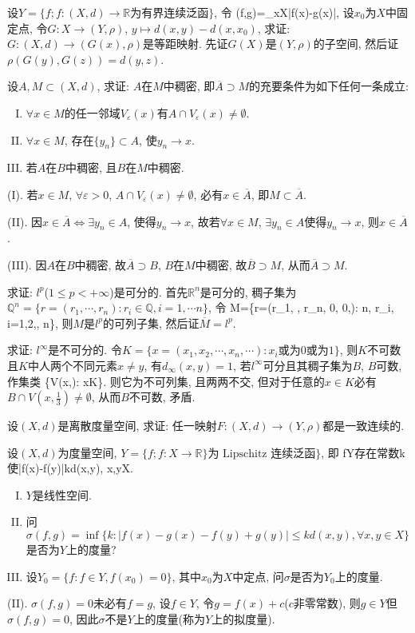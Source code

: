 \bq{}{}
设$Y=\{f; f:(X,d)\to\mathbb{R}\textrm{为有界连续泛函}\}$, 令
\bee
\rho(f,g)=\sup_{x\in X}|f(x)-g(x)|,
\eee
设$x_0$为$X$中固定点, 令$G: X\to(Y,\rho)$, $y\mapsto d(x,y)-d(x, x_0)$, 求证:
$G:(X,d)\to(G(x), \rho)$是等距映射.
\eq
\ba
先证$G(X)$是$(Y,\rho)$的子空间, 然后证$\rho(G(y), G(z))=d(y,z)$.
\ea

\bq{}{}
设$A, M\subset(X,d)$, 求证: $A$在$M$中稠密, 即$\overline{A}\supset M$的充要条件为如下任何一条成立:
\begin{enumerate}[(I)]
 \item $\forall x\in M$的任一邻域$V_{\varepsilon}(x)$有$A\cap V_{\varepsilon}(x)\ne\emptyset$.
 \item $\forall x\in M$, 存在$\{y_n\}\subset A$, 使$y_n\to x$.
 \item 若$A$在$B$中稠密, 且$B$在$M$中稠密.
\end{enumerate}
\eq
\ba
(I).  若$x\in M$, $\forall \varepsilon>0$, $A\cap V_{\varepsilon}(x)\ne \emptyset$, 必有$x\in\overline{A}$, 即$M\subset\overline{A}$.

(II). 因$x\in\overline{A}\Longleftrightarrow\exists y_n\in A$, 使得$y_n\to x$, 故若$\forall x\in M$, $\exists y_n\in A$使得$y_n\to x$, 则$x\in\overline{A}$.

(III). 因$A$在$B$中稠密, 故$\overline{A}\supset B$, $B$在$M$中稠密, 故$\overline{B}\supset M$, 从而$\overline{A}\supset M$.
\ea

\bq{}{}
求证: $l^p$($1\le p<+\infty$)是可分的.
\eq
\ba
首先$\mathbb{R}^n$是可分的, 稠子集为$\mathbb{Q}^n=\{r=(r_1,\cdots,r_n):r_i\in\mathbb{Q},i=1,\cdots n\}$, 
令
\bee
M=\{r=(r_1, \cdots, r_n, 0, 0,\cdots): n\in {}, r_i\in {}, i=1,2,\cdots, n\}, 
\eee
则$M$是$l^p$的可列子集,
然后证$\overline{M}=l^p$.
\ea

\bq{}{}
求证: $l^{\infty}$是不可分的.
\eq
\ba
令$K=\{x=(x_1, x_2,\cdots, x_n, \cdots): x_i\textrm{或为}0\textrm{或为}1\}$, 则$K$不可数且$K$中人两个不同元素$x\ne y$, 
有$d_{\infty}(x,y)=1$, 若$l^{\infty}$可分且其稠子集为$B$, $B$可数, 作集类
\bee
\left\{V\left(x,\right): x\in K\right\}.
\eee
则它为不可列集, 且两两不交, 但对于任意的$x\in K$必有$B\cap V\left(x,\frac13\right)\ne\emptyset$, 从而$B$不可数, 矛盾.
\ea

\bq{}{}
设$(X, d)$是离散度量空间, 求证: 任一映射$F: (X, d)\to(Y, \rho)$都是一致连续的.
\eq

\bq{}{}
设$(X, d)$为度量空间, $Y=\{f; f: X\to \mathbb{R}\}\textrm{为 Lipschitz 连续泛函}\}$, 即
\bee
f\in Y\Longleftrightarrow\textrm{存在常数}k\textrm{使}|f(x)-f(y)|\le kd(x,y), \forall x,y\in X.
\eee
\begin{enumerate}[(I)]
 \item $Y$是线性空间.
 \item 问$\sigma(f,g)=\inf\{k:|f(x)-g(x)-f(y)+g(y)|\le kd(x,y), \forall x,y\in X\}$是否为$Y$上的度量?
 \item 设$Y_0=\{f: f\in Y, f(x_0)=0\}$, 其中$x_0$为$X$中定点, 问$\sigma$是否为$Y_0$上的度量.
\end{enumerate}
\eq
\ba
(II). $\sigma(f,g)=0$未必有$f=g$, 设$f\in Y$, 令$g=f(x)+c$($c$非零常数), 则$g\in Y$但$\sigma(f,g)=0$, 因此$\sigma$不是$Y$上的度量(称为$Y$上的拟度量).


